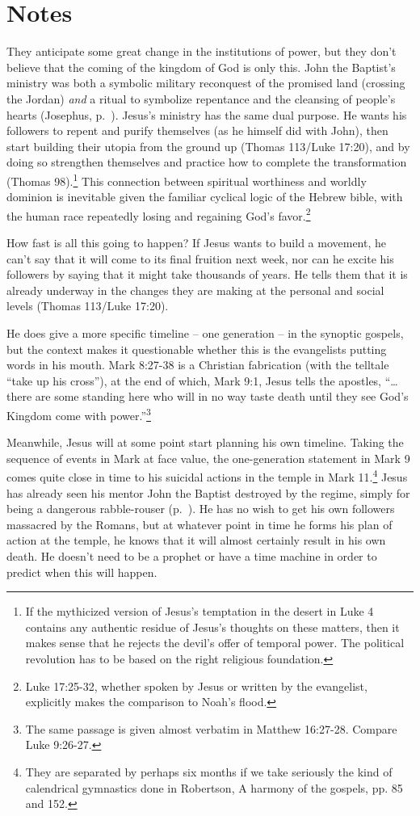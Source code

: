 \documentclass[10pt,twoside]{article} %
\newcommand{\quotesize}{\normalsize{}}
\newcommand{\maintextquotesize}{\renewcommand{\quotesize}{\large{}}}
\newcommand{\notequotesize}{\renewcommand{\quotesize}{\normalsize{}}}
\newcommand{\intex}[1]{\index[texts]{#1}}
\newcommand{\reftex}[1]{#1\intex{#1}}
\newenvironment{notesection}[1]{
  \setcounter{secnumdepth}{0}          %
  \section*{#1}
  \setcounter{secnumdepth}{2}          %
  \notequotesize
}%
{
  \maintextquotesize
}
\begin{document}
\begin{notesection}{Notes}
They anticipate some great change in the institutions of power, but they don't believe
that the coming of the kingdom of God is only this. John the Baptist's ministry was both
a symbolic military reconquest of the promised land (crossing the Jordan) \emph{and}
a ritual to symbolize repentance and the cleansing of people's hearts (Josephus, p.~\pageref{josephus-baptism}).
Jesus's ministry has the same dual purpose.
He wants his followers to repent and purify themselves (as he himself did with John), then
start building their utopia from the ground up (Thomas 113/Luke 17:20), and
by doing so strengthen themselves and practice how to complete the transformation (Thomas 98).\footnote{If the
mythicized version of Jesus's temptation in the desert in Luke 4 contains any authentic residue of Jesus's
thoughts on these matters, then it makes sense that he rejects the devil's offer of temporal power. The political revolution
has to be based on the right religious foundation.}
This connection between spiritual worthiness and worldly dominion is inevitable given the
familiar cyclical logic of the Hebrew bible, with the human race repeatedly losing and
regaining God's favor.\footnote{\reftex{Luke 17:25-32}, whether spoken by Jesus or written by the evangelist,
explicitly makes the comparison to Noah's flood.}

How fast is all this going to happen? If Jesus wants to build a movement, he can't say that
it will come to its final fruition next week, nor can he excite his followers by saying that
it might take thousands of years. He tells them that it is already underway in the changes
they are making at the personal and social levels (Thomas 113/Luke 17:20).

He does give a more specific timeline -- one generation -- in the synoptic gospels, but the context makes it
questionable whether this is the evangelists putting words in his mouth.
\reftex{Mark 8:27-38} is a Christian fabrication (with the telltale ``take up his cross''), at the end of which,
\reftex{Mark 9:1}, Jesus tells the apostles,
``\ldots there are some standing here who will in no way taste death until they see God's Kingdom come with 
power.''\footnote{The same passage is given almost verbatim in \reftex{Matthew 16:27-28}.
Compare \reftex{Luke 9:26-27}.}

Meanwhile, Jesus will at some point start planning his own timeline.
Taking the sequence of events in Mark at face value, the one-generation statement in Mark 9
comes quite close in time to his suicidal actions in the temple in 
Mark 11.\footnote{They are separated by perhaps six months if we take seriously the kind
of calendrical gymnastics done in Robertson, A harmony of the gospels, pp. 85 and 152.}
Jesus has already seen his mentor John the Baptist destroyed by the regime, simply
for being a dangerous rabble-rouser (p.~\pageref{john-the-baptist-death}).
He has no wish to get his own followers massacred by the Romans, but at whatever point
in time he forms his plan of action at the temple, he knows that it will almost certainly
result in his own death. He doesn't need to be a prophet or have a time machine in order
to predict when this will happen.


\end{notesection}
\end{document}

